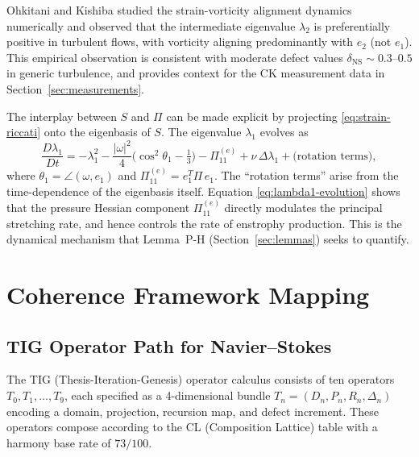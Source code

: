 \documentclass[11pt]{article}
\theoremstyle{definition}
\theoremstyle{remark}
\begin{document}
Ohkitani and Kishiba \cite{Ohkitani} studied the strain-vorticity alignment
dynamics numerically and observed that the intermediate eigenvalue
$\lambda_2$ is preferentially positive in turbulent flows, with
vorticity aligning predominantly with $e_2$ (not $e_1$).  This empirical
observation is consistent with moderate defect values
$\delta_{\mathrm{NS}} \sim 0.3$--$0.5$ in generic turbulence, and provides
context for the CK measurement data in Section~\ref{sec:measurements}.

The interplay between $S$ and $\Pi$ can be made explicit by projecting
\eqref{eq:strain-riccati} onto the eigenbasis of $S$.  The eigenvalue
$\lambda_1$ evolves as
\begin{equation}\label{eq:lambda1-evolution}
  \frac{D\lambda_1}{Dt} = -\lambda_1^2 - \frac{|\omega|^2}{4}
  \bigl(\cos^2\theta_1 - \tfrac{1}{3}\bigr)
  - \Pi_{11}^{(e)} + \nu\,\Delta\lambda_1 + \text{(rotation terms)},
\end{equation}
where $\theta_1 = \angle(\omega, e_1)$ and $\Pi_{11}^{(e)} = e_1^T \Pi\, e_1$.
The ``rotation terms'' arise from the time-dependence of the eigenbasis itself.
Equation \eqref{eq:lambda1-evolution} shows that the pressure Hessian component
$\Pi_{11}^{(e)}$ directly modulates the principal stretching rate, and hence
controls the rate of enstrophy production.  This is the dynamical mechanism
that Lemma~P-H (Section~\ref{sec:lemmas}) seeks to quantify.

\section{Coherence Framework Mapping}
\label{sec:coherence}

\subsection{TIG Operator Path for Navier--Stokes}

The TIG (Thesis-Iteration-Genesis) operator calculus consists of ten operators
$T_0, T_1, \ldots, T_9$, each specified as a 4-dimensional bundle
$T_n = (D_n, P_n, R_n, \Delta_n)$ encoding a domain, projection, recursion map,
and defect increment.  These operators compose according to the CL (Composition
Lattice) table with a harmony base rate of $73/100$.
\end{document}

